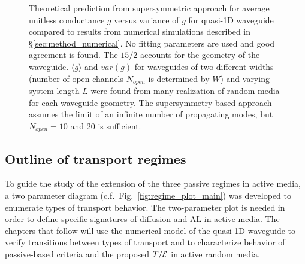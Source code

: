 \begin{figure}
\vskip -0.5cm
\centerline{
}
\vskip -0.5cm
\caption{Theoretical prediction from supersymmetric approach for average unitless conductance $g$ versus variance of $g$ for quasi-1D waveguide\cite{2000_Mirlin} compared to results from numerical simulations described in \S \ref{sec:method_numerical}. No fitting parameters are used and good agreement is found. The $15/2$ accounts for the geometry of the waveguide. $\langle g \rangle$ and $var(g)$ for waveguides of two different widths (number of open channels $N_{open}$ is determined by $W$) and varying system length $L$ were found from many realization of random media for each waveguide geometry. The supersymmetry-based approach assumes the limit of an infinite number of propagating modes, but $N_{open}=10$ and $20$ is sufficient.}
\label{fig:Mirlin_supersymmetry_g_varg}
\end{figure}
  

\subsection{Outline of transport regimes}
\label{sec:twod_plot}
To guide the study of the extension of the three passive regimes in active media, a two parameter diagram (c.f.~Fig.~\ref{fig:regime_plot_main}) was developed to enumerate types of transport behavior. The two-parameter plot is needed in order to define specific signatures of diffusion and AL in active media. The chapters that follow will use the numerical model of the quasi-1D waveguide to verify transitions between types of transport and to characterize behavior of passive-based criteria and the proposed $T/{\cal E}$ in active random media.

